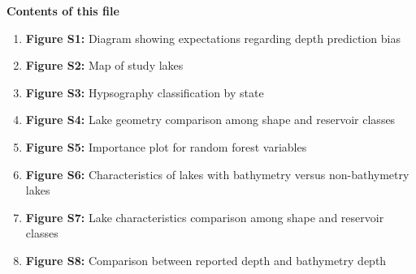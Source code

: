\documentclass[draft,wrr]{agutexSI2019}
\begin{document}
\begin{article}

%
%



\noindent\textbf{Contents of this file}
\begin{enumerate}

\item \textbf{Figure S1:} Diagram showing expectations regarding depth prediction bias

\item \textbf{Figure S2:} Map of study lakes

\item \textbf{Figure S3:} Hypsography classification by state

\item \textbf{Figure S4:} Lake geometry comparison among shape and reservoir classes

\item \textbf{Figure S5:} Importance plot for random forest variables

\item \textbf{Figure S6:} Characteristics of lakes with bathymetry versus non-bathymetry lakes

\item \textbf{Figure S7:} Lake characteristics comparison among shape and reservoir classes

\item \textbf{Figure S8:} Comparison between reported depth and bathymetry depth

\end{enumerate}
\vspace{1em}



%


\end{article}
\end{document}
